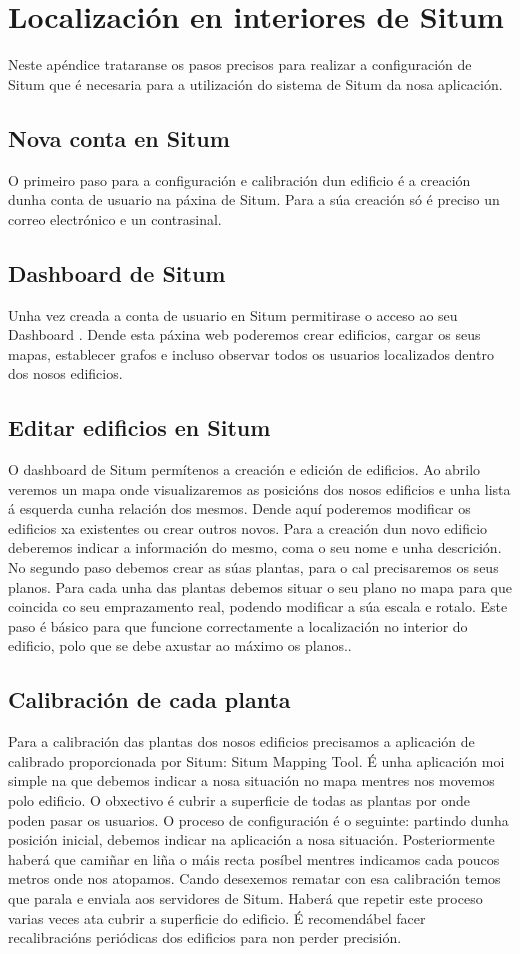 \chapter{Localización en interiores de Situm}
Neste apéndice trataranse os pasos precisos para realizar a configuración de Situm que é necesaria para a utilización do sistema de Situm da nosa aplicación.

\section{Nova conta en Situm}
O primeiro paso para a configuración e calibración dun edificio é a creación dunha conta de usuario na páxina de Situm. Para a súa creación só é preciso un correo electrónico e un contrasinal.

\section{Dashboard de Situm}
Unha vez creada a conta de usuario en Situm permitirase o acceso ao seu Dashboard . Dende esta páxina web poderemos crear edificios, cargar os seus mapas, establecer grafos e incluso observar todos os usuarios localizados dentro dos nosos edificios.

\section{Editar edificios en Situm}
O dashboard de Situm permítenos a creación e edición de edificios. Ao abrilo veremos un mapa onde visualizaremos as posicións dos nosos edificios e unha lista á esquerda cunha relación dos mesmos. Dende aquí poderemos modificar os edificios xa existentes ou crear outros novos.
Para a creación dun novo edificio deberemos indicar a información do mesmo, coma o seu nome e unha descrición. No segundo paso debemos crear as súas plantas, para o cal precisaremos os seus planos. Para cada unha das plantas debemos situar o seu plano no mapa para que coincida co seu emprazamento real, podendo modificar a súa escala e rotalo. Este paso é básico para que funcione correctamente a localización no interior do edificio, polo que se debe axustar ao máximo os planos..

\section{Calibración de cada planta}
Para a calibración das plantas dos nosos edificios precisamos a aplicación de calibrado proporcionada por Situm: Situm Mapping Tool. É unha aplicación moi simple na que debemos indicar a nosa situación no mapa mentres nos movemos polo edificio. O obxectivo é cubrir a superficie de todas as plantas por onde poden pasar os usuarios.
O proceso de configuración é o seguinte: partindo dunha posición inicial, debemos indicar na aplicación a nosa situación. Posteriormente haberá que camiñar en liña o máis recta posíbel mentres indicamos cada poucos metros onde nos atopamos. Cando desexemos rematar con esa calibración temos que parala e enviala aos servidores de Situm. Haberá que repetir este proceso varias veces ata cubrir a superficie do edificio.
É recomendábel facer recalibracións periódicas dos edificios para non perder precisión.

